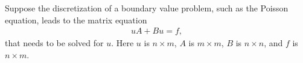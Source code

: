 Suppose the discretization of a boundary value problem, such as the Poisson equation, leads to the matrix equation
\begin{align*}
uA + Bu = f,
\end{align*}
that needs to be solved for $u$. Here $u$ is $n \times m$, $A$ is $m \times m$, $B$ is $n \times n$, and $f$ is $n \times m$.

\begin{questions}


\begin{solution}


\end{solution}
\end{questions}
